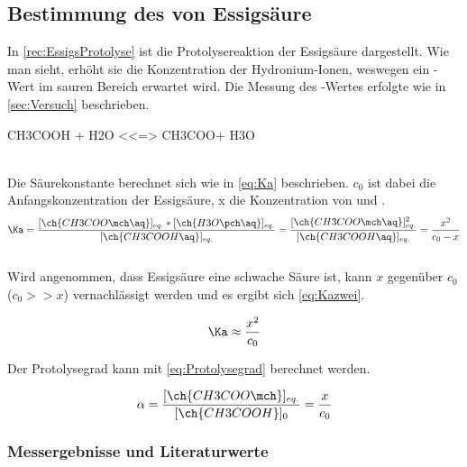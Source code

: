 \documentclass{article}
\begin{document}
    \pagebreak
    
    \subsection{Bestimmung des \pKa von Essigsäure} \label{sec:pKAEssigs}
      
      In \ref{rec:EssigsProtolyse} ist die Protolysereaktion der Essigsäure dargestellt. Wie man sieht, erhöht sie die Konzentration der Hydronium-Ionen, weswegen ein \pH-Wert im sauren Bereich erwartet wird. Die Messung des \pH-Wertes erfolgte wie in \ref{sec:Versuch} beschrieben.\\
      
      \begin{reaction}
        CH3COOH + H2O <<=> CH3COO\mch[] + H3O\pch \label{rec:EssigsProtolyse} \\
      \end{reaction} \\
      
      Die Säurekonstante \Ka berechnet sich wie in \eqref{eq:Ka} beschrieben. $c_{0}$ ist dabei die Anfangskonzentration der Essigsäure, x die Konzentration von  und .\\
      
      \begin{equation}
        \Ka = \frac{[\ch{CH3COO\mch\aq}]_{eq.}*[\ch{H3O\pch\aq}]_{eq.}}{[\ch{CH3COOH\aq}]_{eq.}} = \frac{[\ch{CH3COO\mch\aq}]_{eq.}^2}{[\ch{CH3COOH\aq}]_{eq.}} = \frac{x^2}{c_{0}-x} \label{eq:Ka}
      \end{equation} \\
      
      Wird angenommen, dass Essigsäure eine schwache Säure ist, kann $x$ gegenüber $c_{0}$ ($c_{0} >> x$) vernachlässigt werden und es ergibt sich \eqref{eq:Kazwei}.
      
      \begin{equation}
        \Ka \approx \frac{x^2}{c_{0}} \label{eq:Kazwei}
      \end{equation}
      
      Der Protolysegrad kann mit \eqref{eq:Protolysegrad} berechnet werden.
      
      \begin{equation}
        \alpha = \frac{[\ch{CH3COO\mch}]_{eq.}}{[\ch{CH3COOH}]_{0}} = \frac{x}{c_{0}} \label{eq:Protolysegrad}
      \end{equation}
      
      \subsubsection{Messergebnisse und Literaturwerte} \label{sec:MessergebnisseEssigs}
      
\end{document}

